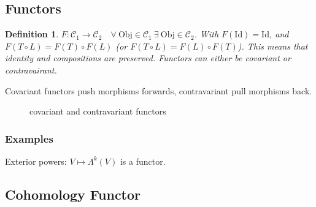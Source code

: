 \documentclass[10pt]{amsart}
\newtheorem{definition}{Definition}[section]
\newcommand{\ra}{\rightarrow}
\newcommand{\id}{\text{Id}}
\newcommand{\C}{\mathcal{C}}
\newcommand{\obj}{\text{Obj}}
\renewcommand{\o}{\circ}
\renewcommand{\*}{\star}
\begin{document}
\subsection{Functors}%
\label{sub:functors}

\begin{definition}
  $F:\C_1\ra\C_2\quad\forall\ \obj\in\C_1\ \exists\ \obj\in\C_2$. With
  $F(\id)=\id$, and $F(T\o L)=F(T)\o F(L)$ (or $F(T\o L)=F(L)\o F(T)$).
  This means that identity and compositions are preserved. Functors can either
  be covariant or contravairant.
\end{definition}

Covariant functors push morphisms forwards, contravariant pull morphisms back.

\begin{figure}[htpb]
\begin{center}
\end{center}
\caption{covariant and contravariant functors}
\label{fig:functors}
\end{figure}

\subsubsection{Examples}%
\label{ssub:examples}

Exterior powers:
$V\mapsto\Lambda^k(V)$ is a functor.

\subsection{Cohomology Functor}%
\label{sub:cohomology_functor}
\end{document}
